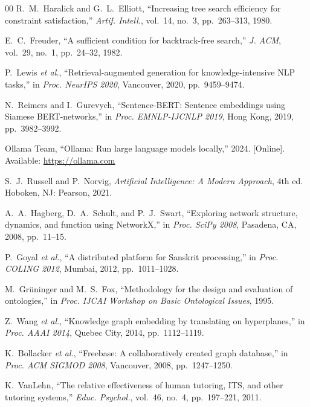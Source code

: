 \documentclass[conference]{IEEEtran}
\begin{document}
\begin{thebibliography}{00}
R.~M.~Haralick and G.~L.~Elliott,
``Increasing tree search efficiency for constraint satisfaction,''
\textit{Artif. Intell.}, vol.~14, no.~3, pp.~263--313, 1980.

E.~C.~Freuder,
``A sufficient condition for backtrack-free search,''
\textit{J. ACM}, vol.~29, no.~1, pp.~24--32, 1982.

P.~Lewis \textit{et al.},
``Retrieval-augmented generation for knowledge-intensive NLP tasks,''
in \textit{Proc. NeurIPS 2020}, Vancouver, 2020, pp.~9459--9474.

N.~Reimers and I.~Gurevych,
``Sentence-BERT: Sentence embeddings using Siamese BERT-networks,''
in \textit{Proc. EMNLP-IJCNLP 2019}, Hong Kong, 2019, pp.~3982--3992.

Ollama Team,
``Ollama: Run large language models locally,''
2024. [Online]. Available: \url{https://ollama.com}

S.~J.~Russell and P.~Norvig,
\textit{Artificial Intelligence: A Modern Approach}, 4th ed.
Hoboken, NJ: Pearson, 2021.

A.~A.~Hagberg, D.~A.~Schult, and P.~J.~Swart,
``Exploring network structure, dynamics, and function using NetworkX,''
in \textit{Proc. SciPy 2008}, Pasadena, CA, 2008, pp.~11--15.

P.~Goyal \textit{et al.},
``A distributed platform for Sanskrit processing,''
in \textit{Proc. COLING 2012}, Mumbai, 2012, pp.~1011--1028.

M.~Gr\"{u}ninger and M.~S.~Fox,
``Methodology for the design and evaluation of ontologies,''
in \textit{Proc. IJCAI Workshop on Basic Ontological Issues}, 1995.

Z.~Wang \textit{et al.},
``Knowledge graph embedding by translating on hyperplanes,''
in \textit{Proc. AAAI 2014}, Quebec City, 2014, pp.~1112--1119.

K.~Bollacker \textit{et al.},
``Freebase: A collaboratively created graph database,''
in \textit{Proc. ACM SIGMOD 2008}, Vancouver, 2008, pp.~1247--1250.

K.~VanLehn,
``The relative effectiveness of human tutoring, ITS, and other tutoring systems,''
\textit{Educ. Psychol.}, vol.~46, no.~4, pp.~197--221, 2011.


\end{thebibliography}
\end{document}
